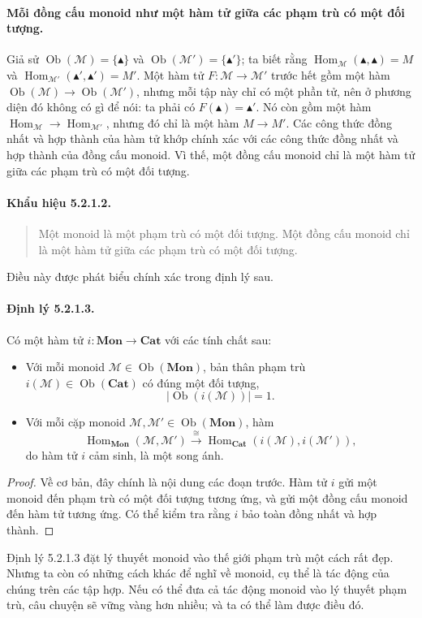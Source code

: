 \paragraph{Mỗi đồng cấu monoid như một hàm tử giữa các phạm trù có một đối tượng.} Giả sử $\operatorname{Ob}(\mathcal M)=\{\blacktriangle\}$ và $\operatorname{Ob}(\mathcal M')=\{\blacktriangle'\}$; ta biết rằng $\operatorname{Hom}_{\mathcal M}(\blacktriangle,\blacktriangle)=M$ và $\operatorname{Hom}_{\mathcal M'}(\blacktriangle',\blacktriangle')=M'$. Một hàm tử $F:\mathcal M\to\mathcal M'$ trước hết gồm một hàm $\operatorname{Ob}(\mathcal M)\to\operatorname{Ob}(\mathcal M')$, nhưng mỗi tập này chỉ có một phần tử, nên ở phương diện đó không có gì để nói: ta phải có $F(\blacktriangle)=\blacktriangle'$. Nó còn gồm một hàm $\operatorname{Hom}_{\mathcal M}\to\operatorname{Hom}_{\mathcal M'}$, nhưng đó chỉ là một hàm $M\to M'$. Các công thức đồng nhất và hợp thành của hàm tử khớp chính xác với các công thức đồng nhất và hợp thành của đồng cấu monoid. Vì thế, một đồng cấu monoid chỉ là một hàm tử giữa các phạm trù có một đối tượng.
\paragraph{Khẩu hiệu 5.2.1.2.}\begin{quote}Một monoid là một phạm trù có một đối tượng. Một đồng cấu monoid chỉ là một hàm tử giữa các phạm trù có một đối tượng.\end{quote}
Điều này được phát biểu chính xác trong định lý sau.
\paragraph{Định lý 5.2.1.3.} Có một hàm tử $i:\mathbf{Mon}\to\mathbf{Cat}$ với các tính chất sau:
\begin{itemize}
\item Với mỗi monoid $\mathcal M\in\operatorname{Ob}(\mathbf{Mon})$, bản thân phạm trù $i(\mathcal M)\in\operatorname{Ob}(\mathbf{Cat})$ có đúng một đối tượng,
\[|\operatorname{Ob}(i(\mathcal M))|=1.\]
\item Với mỗi cặp monoid $\mathcal M,\mathcal M'\in\operatorname{Ob}(\mathbf{Mon})$, hàm
\[\operatorname{Hom}_{\mathbf{Mon}}(\mathcal M,\mathcal M')\xrightarrow{\cong}\operatorname{Hom}_{\mathbf{Cat}}(i(\mathcal M),i(\mathcal M')),\]
do hàm tử $i$ cảm sinh, là một song ánh.
\end{itemize}
\begin{proof}Về cơ bản, đây chính là nội dung các đoạn trước. Hàm tử $i$ gửi một monoid đến phạm trù có một đối tượng tương ứng, và gửi một đồng cấu monoid đến hàm tử tương ứng. Có thể kiểm tra rằng $i$ bảo toàn đồng nhất và hợp thành.\end{proof}
Định lý 5.2.1.3 đặt lý thuyết monoid vào thế giới phạm trù một cách rất đẹp. Nhưng ta còn có những cách khác để nghĩ về monoid, cụ thể là tác động của chúng trên các tập hợp. Nếu có thể đưa cả tác động monoid vào lý thuyết phạm trù, câu chuyện sẽ vững vàng hơn nhiều; và ta có thể làm được điều đó.
